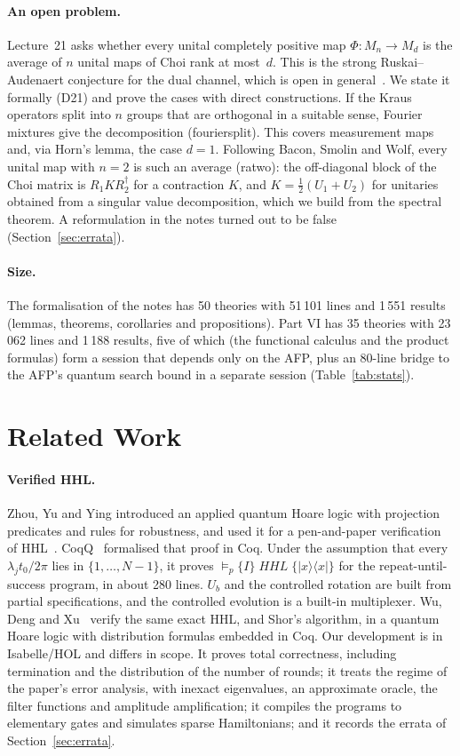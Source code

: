 \documentclass[runningheads]{llncs}
\newcommand{\ketbra}[2]{|#1\rangle\langle #2|}
\DeclareRobustCommand{\isa}[1]{\textsf{\def\_{\char95\allowbreak}#1}}
\newcommand{\hoarep}[3]{\models_{p}\{#1\}\;#2\;\{#3\}}
\begin{document}
\paragraph{An open problem.} Lecture~21 asks whether every unital completely positive map
$\Phi:M_n\to M_d$ is the average of $n$ unital maps of Choi rank at most~$d$. This is the strong
Ruskai--Audenaert conjecture for the dual channel, which is open in general~\cite{kumarwolf2026}. We state
it formally (\isa{D21\_2}) and prove the cases with direct constructions. If the Kraus operators split
into $n$ groups that are orthogonal in a suitable sense, Fourier mixtures give the decomposition
(\isa{fourier\_split}). This covers measurement maps and, via Horn's lemma, the case $d=1$. Following
Bacon, Smolin and Wolf, every unital map with $n=2$ is such an average (\isa{ra\_two}): the off-diagonal
block of the Choi matrix is $R_1KR_2^\dagger$ for a contraction $K$, and $K=\frac12(U_1+U_2)$ for unitaries
obtained from a singular value decomposition, which we build from the spectral theorem. A
reformulation in the notes turned out to be false (Section~\ref{sec:errata}).

\paragraph{Size.} The formalisation of the notes has 50 theories with 51\,101 lines and 1\,551 results
(lemmas, theorems, corollaries and propositions). Part VI has 35 theories with 23\,062 lines and 1\,188
results, five of which (the functional calculus and the product formulas) form a session that depends
only on the AFP, plus an 80-line bridge to the AFP's quantum search bound in a separate session
(Table~\ref{tab:stats}).
\section{Related Work}\label{sec:related}

\paragraph{Verified HHL.} Zhou, Yu and Ying introduced an applied quantum Hoare logic with projection
predicates and rules for robustness, and used it for a pen-and-paper verification of
HHL~\cite{zhou2019applied}. CoqQ~\cite{zhou2023coqq} formalised that proof in Coq. Under the assumption
that every $\lambda_jt_0/2\pi$ lies in $\{1,\dots,N-1\}$, it proves $\hoarep{I}{\mathit{HHL}}{\ketbra xx}$
for the repeat-until-success program, in about 280 lines. $U_b$ and the controlled rotation are built
from partial specifications, and the controlled evolution is a built-in multiplexer. Wu, Deng and Xu~\cite{wu2024local} verify the
same exact HHL, and Shor's algorithm, in a quantum Hoare logic with distribution formulas embedded in
Coq. Our development is in Isabelle/HOL and differs in scope. It proves total correctness, including
termination and the distribution of the number of rounds; it treats the regime of the paper's error
analysis, with inexact eigenvalues, an approximate oracle, the filter functions and amplitude
amplification; it compiles the programs to elementary gates and simulates sparse Hamiltonians; and it
records the errata of Section~\ref{sec:errata}.
\end{document}
